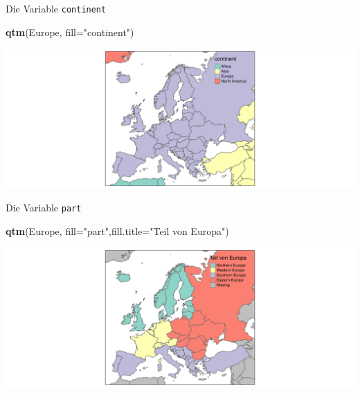 \documentclass[ignorenonframetext,]{beamer}
\newenvironment{Shaded}{\begin{snugshade}}{\end{snugshade}}
\newcommand{\KeywordTok}[1]{\textcolor[rgb]{0.13,0.29,0.53}{\textbf{#1}}}
\newcommand{\DataTypeTok}[1]{\textcolor[rgb]{0.13,0.29,0.53}{#1}}
\newcommand{\StringTok}[1]{\textcolor[rgb]{0.31,0.60,0.02}{#1}}
\newcommand{\NormalTok}[1]{#1}
\begin{document}
\begin{frame}[fragile]{Die Variable \texttt{continent}}

\begin{Shaded}
\begin{Highlighting}[]
\KeywordTok{qtm}\NormalTok{(Europe, }\DataTypeTok{fill=}\StringTok{"continent"}\NormalTok{)}
\end{Highlighting}
\end{Shaded}

\includegraphics{tmap_files/figure-beamer/unnamed-chunk-14-1.pdf}

\end{frame}

\begin{frame}[fragile]{Die Variable \texttt{part}}

\begin{Shaded}
\begin{Highlighting}[]
\KeywordTok{qtm}\NormalTok{(Europe, }\DataTypeTok{fill=}\StringTok{"part"}\NormalTok{,}\DataTypeTok{fill.title=}\StringTok{"Teil von Europa"}\NormalTok{)}
\end{Highlighting}
\end{Shaded}

\includegraphics{tmap_files/figure-beamer/unnamed-chunk-15-1.pdf}

\end{frame}
\end{document}
